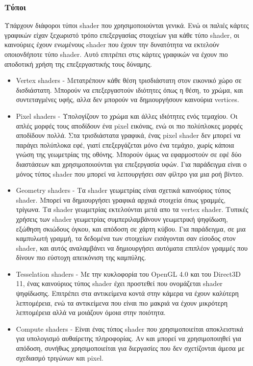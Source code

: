 \subsubsection{Τύποι}
Υπάρχουν διάφοροι τύποι shader που χρησιμοποιούνται γενικά. Ενώ οι παλιές κάρτες γραφικών είχαν ξεχωριστό τρόπο επεξεργασίας στοιχείων για κάθε τύπο shader, οι καινούριες έχουν ενωμένους shader που έχουν την δυνατότητα να εκτελούν οποιονδήποτε τύπο shader. Αυτό επιτρέπει στις κάρτες γραφικών να έχουν πιο αποδοτική χρήση της επεξεργαστικής τους δύναμης.\cite{computeshaders-2}
\begin{itemize}
\item Vertex shaders - Μετατρέπουν κάθε θέση τρισδιάστατη στον εικονικό χώρο σε δισδιάστατη. Μπορούν να επεξεργαστούν ιδιότητες όπως η θέση, το χρώμα, και συντεταγμένες υφής, αλλα δεν μπορούν να δημιουργήσουν καινούρια vertices.
\item Pixel shaders - Υπολογίζουν το χρώμα και άλλες ιδιότητες ενός τεμαχίου. Οι απλές μορφές τους αποδίδουν ένα pixel εικόνας, ενώ οι πιο πολύπλοκες μορφές αποδίδουν πολλά. Στα τρισδιάστατα γραφικά, ένας pixel shader δεν μπορεί να παράγει πολύπλοκα εφέ, γιατί επεξεργάζεται μόνο ένα τεμάχιο, χωρίς κάποια γνώση της γεωμετρίας της οθόνης. Μπορούν όμως να εφαρμοστούν σε εφέ δύο διαστάσεων και χρησιμοποιούνται για επεξεργασία υφών. Για παράδειγμα είναι ο μόνος τύπος shader που μπορεί να λειτουργήσει σαν φίλτρο για μια ροή βίντεο.
\item Geometry shaders - Τα shader γεωμετρίας είναι σχετικά καινούριος τύπος shader. Μπορεί να δημιουργήσει γραφικά αρχικά στοιχεία όπως γραμμές, τρίγωνα. Τα shader γεωμετρίας εκτελούνται μετά απο τα vertex shader. Τυπικές χρήσεις των shader γεωμετρίας συμπεριλαμβάνουν γεωμετρική ψηφίδωση, εξώθηση σκιώδους όγκου, και απόδοση σε χάρτη κύβου. Για παράδειγμα, σε μια καμπυλωτή γραμμή, τα δεδομένα των στοιχείων εισάγονται σαν είσοδος στον shader, και αυτός αναλαμβάνει να δημιουργήσει αυτόματα επιπλέον γραμμές που δίνουν πιο εύστοχη απεικόνιση της καμπύλης.
\item Tesselation shaders - Με την κυκλοφορία του OpenGL 4.0 και του Direct3D 11, ένας καινούριος τύπος shader έχει προστεθεί που ονομάζεται shader ψηφίδωσης. Επιτρέπει στα αντικείμενα κοντά στην κάμερα να έχουν καλύτερη λεπτομέρεια, ενώ τα αντικείμενα που είναι πιο μακριά να έχουν μικρότερη λεπτομέρεια αλλά να μοιάζουν όμοια στην ποιότητα.
\item Compute shaders - Είναι ένας τύπος shader που χρησιμοποιείται αποκλειστικά για υπολογισμό αυθαίρετης πληροφορίας. Αν και μπορεί να χρησιμοποιηθεί για απόδοση, συνήθως χρησιμοποιείται για διεργασίες που δεν σχετίζονται άμεσα με σχεδιασμό τριγώνων και pixel.
\end{itemize}
